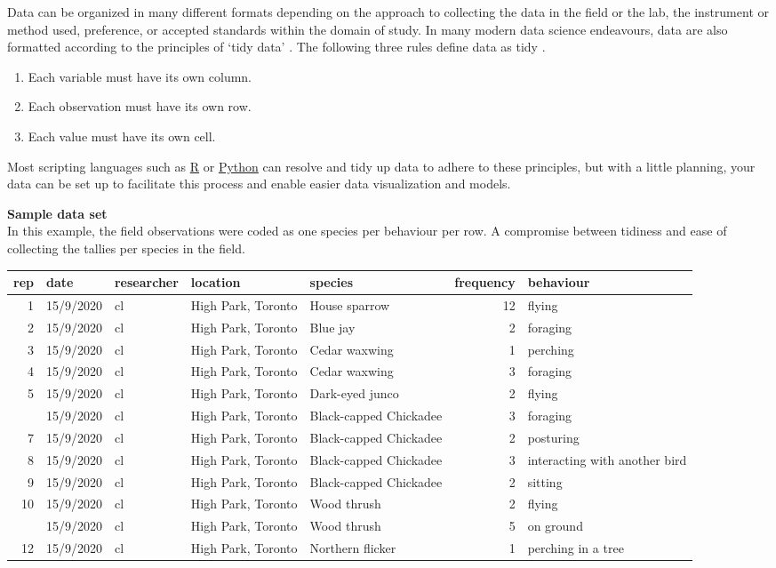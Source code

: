 \documentclass[
]{book}
\providecommand{\tightlist}{%
  \setlength{\itemsep}{0pt}\setlength{\parskip}{0pt}}
\begin{document}
Data can be organized in many different formats depending on the approach to collecting the data in the field or the lab, the instrument or method used, preference, or accepted standards within the domain of study. In many modern data science endeavours, data are also formatted according to the principles of `tidy data' \citep{RN4416}. The following three rules define data as tidy \citep{RN4369}.

\begin{enumerate}
\def\labelenumi{\arabic{enumi}.}
\tightlist
\item
  Each variable must have its own column.\\
\item
  Each observation must have its own row.\\
\item
  Each value must have its own cell.
\end{enumerate}

Most scripting languages such as \href{https://www.r-project.org}{R} or \href{https://www.python.org}{Python} can resolve and tidy up data to adhere to these principles, but with a little planning, your data can be set up to facilitate this process and enable easier data visualization and models.

\textbf{Sample data set}\\
In this example, the field observations were coded as one species per behaviour per row. A compromise between tidiness and ease of collecting the tallies per species in the field.

\begin{tabular}{rllllrl}
\toprule
rep & date & researcher & location & species & frequency & behaviour\\
\midrule
1 & 15/9/2020 & cl & High Park, Toronto & House sparrow & 12 & flying\\
2 & 15/9/2020 & cl & High Park, Toronto & Blue jay & 2 & foraging\\
3 & 15/9/2020 & cl & High Park, Toronto & Cedar waxwing & 1 & perching\\
4 & 15/9/2020 & cl & High Park, Toronto & Cedar waxwing & 3 & foraging\\
5 & 15/9/2020 & cl & High Park, Toronto & Dark-eyed junco & 2 & flying\\
\addlinespace
6 & 15/9/2020 & cl & High Park, Toronto & Black-capped Chickadee & 3 & foraging\\
7 & 15/9/2020 & cl & High Park, Toronto & Black-capped Chickadee & 2 & posturing\\
8 & 15/9/2020 & cl & High Park, Toronto & Black-capped Chickadee & 3 & interacting with another bird\\
9 & 15/9/2020 & cl & High Park, Toronto & Black-capped Chickadee & 2 & sitting\\
10 & 15/9/2020 & cl & High Park, Toronto & Wood thrush & 2 & flying\\
\addlinespace
11 & 15/9/2020 & cl & High Park, Toronto & Wood thrush & 5 & on ground\\
12 & 15/9/2020 & cl & High Park, Toronto & Northern flicker & 1 & perching in a tree\\
\bottomrule
\end{tabular}
\end{document}
